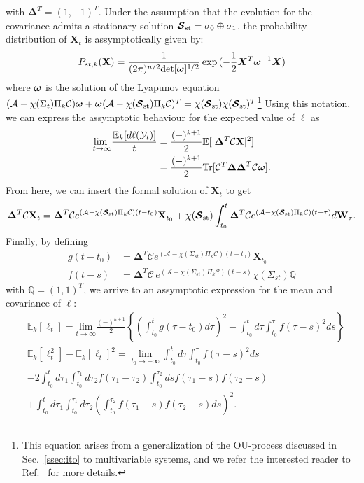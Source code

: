 with $\mathbf{\Delta}^{T}= (1,-1)^{T}$. Under the assumption that the evolution for the covariance admits a stationary solution $\bm{\mathcal{S}}_{\text{st}}= \sigma_{0}\oplus\sigma_{1}$, the probability distribution of $\mathbf{X}_{t}$ is assymptotically given by:
\begin{equation}
P_{st,k}(\bold{X})=  \frac{1}{(2\pi)^{n/2} \text{det}[\boldsymbol{\omega}]^{1/2}}\exp{(-\frac{1}{2}\bm{X}^{T}\boldsymbol{\omega}^{-1}\bm{X}})
\end{equation}
where $\boldsymbol{\omega}$ is the solution of the Lyapunov equation $(\mathcal{A}-\chi(\Sigma_{t})\Pi_{k}\mathcal{C})\boldsymbol{\omega}+\boldsymbol{\omega}(\mathcal{A}-\chi(\bm{\mathcal{S}}_{\text{st}})\Pi_{k}\mathcal{C})^{T}=\chi(\bm{\mathcal{S}}_{\text{st}})\chi(\bm{\mathcal{S}}_{\text{st}})^T$\footnote{This equation arises from a generalization of the OU-process discussed in Sec.~\ref{ssec:ito} to multivariable systems, and we refer the interested reader to Ref.~\cite{gardiner2004handbook} for more details.}
Using this notation, we can express the assymptotic behaviour for the expected value of $\ell$ as
\begin{align}\label{eq:dlimit}
\underset{t\to \infty }{\text{lim }}\frac{\mathbb{E}_{k}[d\ell(\mathcal{Y}_{t})]}{t} &= \frac{(-)^{k+1}}{2}\mathbb{E}[ |\mathbf{\Delta}^{T}\mathcal{C}\mathbf{X}|^{2}] \nonumber\\
&= \frac{(-)^{k+1}}{2}\text{Tr}[\mathcal{C}^{T}\mathbf{\Delta\Delta}^{T}\mathcal{C}\boldsymbol{\omega}].
\end{align}
From here, we can insert the formal solution of $\mathbf{X}_{t}$ to get
\begin{equation}
\mathbf{\Delta}^{T}\mathcal{C}\mathbf{X}_{t} = \mathbf{\Delta}^{T}\mathcal{C}e^{(\mathcal{A}-\chi(\bm{\mathcal{S}}_{\text{st}})\Pi_{k}\mathcal{C})(t-t_0)}\mathbf{X}_{t_{0}} + \chi(\bm{\mathcal{S}}_{\text{st}}) \int_{t_{0}}^{t} \mathbf{\Delta}^{T}\mathcal{C} e^{(\mathcal{A}-\chi(\bm{\mathcal{S}}_{\text{st}}) \Pi_{k}\mathcal{C}) (t-\tau)} d\mathbf{W}_\tau.
\end{equation}
Finally, by defining
\begin{align}
g(t-t_{0}) &= \mathbf{\Delta}^{T}\mathcal{C}e^{(\mathcal{A}-\chi(\Sigma_{st})\Pi_{k}\mathcal{C})(t-t_{0})}\mathbf{X}_{t_{0}} \nonumber\\
f(t-s) &= \mathbf{\Delta}^{T}\mathcal{C}\, e^{(\mathcal{A}-\chi(\Sigma_{st})\Pi_{k} \mathcal{C})(t-s)} \chi(\Sigma_{st})\mathbb{Q}
\end{align}
with $\mathbb{Q}= (1,1)^{T}$, we arrive to an assymptotic expression for the mean and covariance of $\ell$:
\begin{align*}
&\mathbb{E}_{k}[\ell_{t}] =
\underset{t\rightarrow\infty}{\text{lim}} \frac{(-)^{k+1}}{2}\left\{\left(\int_{t_{0}}^{t}g(\tau-t_{0})d\tau\right)^{2} -\int_{t_{0}}^{t}d\tau \int_{t_{0}}^{\tau} f(\tau-s)^{2}ds\right\} \nonumber\\
&\mathbb{E}_{k}[\ell_{t}^{2}]-\mathbb{E}_{k}[\ell_{t}]^{2} =
\lim_{t_{0} \to -\infty } \int_{t_{0}}^{t}d\tau\int_{t_{0}}^{\tau}f(\tau-s)^{2}ds \nonumber\\
&-2\int_{t_{0}}^{t}d\tau_{1}\int_{t_{0}}^{\tau_{1}}d\tau_{2}f(\tau_{1}-\tau_{2})\int_{t_0}^{\tau_{2}}dsf(\tau_{1}-s)f(\tau_{2}-s)\nonumber\\
&+\int_{t_{0}}^{t}d\tau_{1}\int_{t_{0}}^{\tau_{1}}d\tau_{2}\left(\int_{t_{0}}^{\tau_{2}}f(\tau_{1}-s)f(\tau_{2}-s)ds\right)^{2}.
\end{align*}
